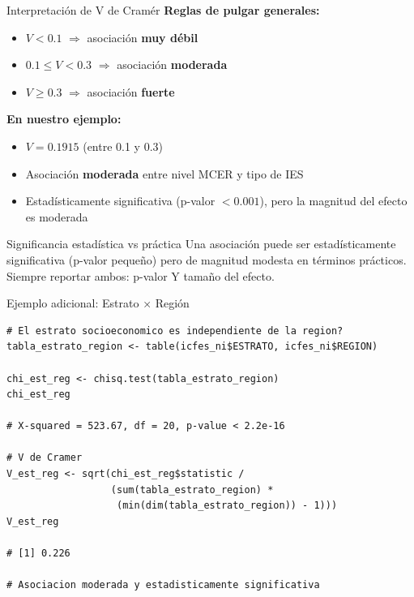 \documentclass[aspectratio=169, 11pt]{beamer}
\begin{document}
\begin{frame}{Interpretación de V de Cramér}
\textbf{Reglas de pulgar generales:}
\begin{itemize}
  \item $V < 0.1$ $\Rightarrow$ asociación \textbf{muy débil}
  \item $0.1 \leq V < 0.3$ $\Rightarrow$ asociación \textbf{moderada}
  \item $V \geq 0.3$ $\Rightarrow$ asociación \textbf{fuerte}
\end{itemize}

\vspace{0.3cm}
\textbf{En nuestro ejemplo:}
\begin{itemize}
  \item $V = 0.1915$ (entre 0.1 y 0.3)
  \item Asociación \textbf{moderada} entre nivel MCER y tipo de IES
  \item Estadísticamente significativa (p-valor $< 0.001$), pero la magnitud del efecto es moderada
\end{itemize}

\vspace{0.3cm}
\begin{alertblock}{Significancia estadística vs práctica}
Una asociación puede ser estadísticamente significativa (p-valor pequeño) pero de magnitud modesta en términos prácticos. Siempre reportar ambos: p-valor Y tamaño del efecto.
\end{alertblock}
\end{frame}

\begin{frame}[fragile]{Ejemplo adicional: Estrato × Región}
\begin{lstlisting}
# El estrato socioeconomico es independiente de la region?
tabla_estrato_region <- table(icfes_ni$ESTRATO, icfes_ni$REGION)

chi_est_reg <- chisq.test(tabla_estrato_region)
chi_est_reg

# X-squared = 523.67, df = 20, p-value < 2.2e-16

# V de Cramer
V_est_reg <- sqrt(chi_est_reg$statistic /
                  (sum(tabla_estrato_region) *
                   (min(dim(tabla_estrato_region)) - 1)))
V_est_reg

# [1] 0.226

# Asociacion moderada y estadisticamente significativa
\end{lstlisting}
\end{frame}
\end{document}
